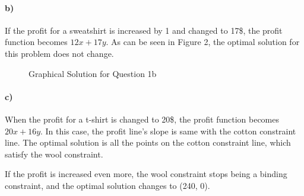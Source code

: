 \documentclass{article}
\begin{document}
\paragraph*{b)}
If the profit for a sweatshirt is increased by 1 and changed to 17\$, the profit function becomes $12x + 17y$.
As can be seen in Figure 2, the optimal solution for this problem does not change.
\begin{figure}[H]
    \centering
    \caption{Graphical Solution for Question 1b}
\end{figure}

\paragraph*{c)}
When the profit for a t-shirt is changed to 20\$, the profit function becomes $20x + 16y$. In this case, the profit line's slope is same with the cotton constraint line.
The optimal solution is all the points on the cotton constraint line, which satisfy the wool constraint.

If the profit is increased even more, the wool constraint stops being a binding constraint, and the optimal solution changes to (240, 0).
\end{document}
